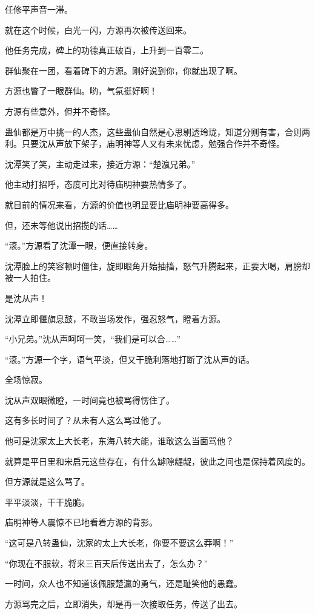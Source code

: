 \begin{this_body}
任修平声音一滞。

就在这个时候，白光一闪，方源再次被传送回来。

他任务完成，碑上的功德真正破百，上升到一百零二。

群仙聚在一团，看着碑下的方源。刚好说到你，你就出现了啊。

方源也瞥了一眼群仙。哟，气氛挺好啊！

方源有些意外，但并不奇怪。

蛊仙都是万中挑一的人杰，这些蛊仙自然是心思剔透玲珑，知道分则有害，合则两利。只要沈从声放下架子，庙明神等人又有未来忧虑，勉强合作并不奇怪。

沈潭笑了笑，主动走过来，接近方源：“楚瀛兄弟。”

他主动打招呼，态度可比对待庙明神要热情多了。

就目前的情况来看，方源的价值也明显要比庙明神要高得多。

但，还未等他说出招揽的话……

“滚。”方源看了沈潭一眼，便直接转身。

沈潭脸上的笑容顿时僵住，旋即眼角开始抽搐，怒气升腾起来，正要大喝，肩膀却被一人拍住。

是沈从声！

沈潭立即偃旗息鼓，不敢当场发作，强忍怒气，瞪着方源。

“小兄弟。”沈从声呵呵一笑，“我们是可以合……”

“滚。”方源一个字，语气平淡，但又干脆利落地打断了沈从声的话。

全场惊寂。

沈从声双眼微瞪，一时间竟也被骂得愣住了。

这有多长时间了？从未有人这么骂过他了。

他可是沈家太上大长老，东海八转大能，谁敢这么当面骂他？

就算是平日里和宋启元这些存在，有什么罅隙龌龊，彼此之间也是保持着风度的。

但方源就是这么骂了。

平平淡淡，干干脆脆。

庙明神等人震惊不已地看着方源的背影。

“这可是八转蛊仙，沈家的太上大长老，你要不要这么莽啊！”

“你现在不服软，将来三百天后传送出去了，怎么办？”

一时间，众人也不知道该佩服楚瀛的勇气，还是耻笑他的愚蠢。

方源骂完之后，立即消失，却是再一次接取任务，传送了出去。


\end{this_body}
